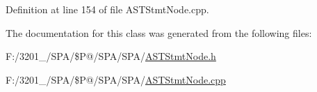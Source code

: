 Definition at line 154 of file A\-S\-T\-Stmt\-Node.\-cpp.



The documentation for this class was generated from the following files\-:\begin{DoxyCompactItemize}
\item 
F\-:/3201\-\_/\-S\-P\-A/\$\-P@/\-S\-P\-A/\-S\-P\-A/\hyperlink{_a_s_t_stmt_node_8h}{A\-S\-T\-Stmt\-Node.\-h}\item 
F\-:/3201\-\_/\-S\-P\-A/\$\-P@/\-S\-P\-A/\-S\-P\-A/\hyperlink{_a_s_t_stmt_node_8cpp}{A\-S\-T\-Stmt\-Node.\-cpp}\end{DoxyCompactItemize}
